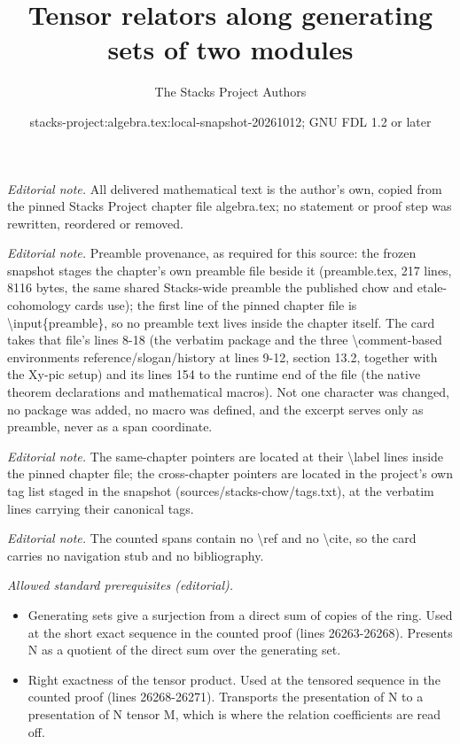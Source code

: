 \documentclass[10pt,a4paper]{amsart}
\title{Tensor relators along generating sets of two modules}
\author{The Stacks Project Authors}
\date{stacks-project:algebra.tex:local-snapshot-20261012; GNU FDL 1.2 or later}
\theoremstyle{plain}
\theoremstyle{definition}
\theoremstyle{remark}
\numberwithin{equation}{subsection}
\begin{document}
\maketitle
\noindent\textit{Editorial note.} All delivered mathematical text is the author's own, copied from the pinned Stacks Project chapter file algebra.tex; no statement or proof step was rewritten, reordered or removed.\par\medskip
\noindent\textit{Editorial note.} Preamble provenance, as required for this source: the frozen snapshot stages the chapter's own preamble file beside it (preamble.tex, 217 lines, 8116 bytes, the same shared Stacks-wide preamble the published chow and etale-cohomology cards use); the first line of the pinned chapter file is \textbackslash{}input\{preamble\}, so no preamble text lives inside the chapter itself. The card takes that file's lines 8-18 (the verbatim package and the three \textbackslash{}comment-based environments reference/slogan/history at lines 9-12, section 13.2, together with the Xy-pic setup) and its lines 154 to the runtime end of the file (the native theorem declarations and mathematical macros). Not one character was changed, no package was added, no macro was defined, and the excerpt serves only as preamble, never as a span coordinate.\par\medskip
\noindent\textit{Editorial note.} The same-chapter pointers are located at their \textbackslash{}label lines inside the pinned chapter file; the cross-chapter pointers are located in the project's own tag list staged in the snapshot (sources/stacks-chow/tags.txt), at the verbatim lines carrying their canonical tags.\par\medskip
\noindent\textit{Editorial note.} The counted spans contain no \textbackslash{}ref and no \textbackslash{}cite, so the card carries no navigation stub and no bibliography.\par\medskip
\noindent\textit{Allowed standard prerequisites (editorial).}\begin{itemize}
\item Generating sets give a surjection from a direct sum of copies of the ring. Used at the short exact sequence in the counted proof (lines 26263-26268). Presents N as a quotient of the direct sum over the generating set.
\item Right exactness of the tensor product. Used at the tensored sequence in the counted proof (lines 26268-26271). Transports the presentation of N to a presentation of N tensor M, which is where the relation coefficients are read off.
\end{itemize}\medskip
\end{document}
